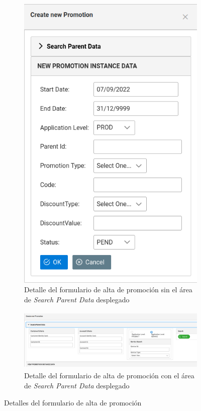 \begin{figure}[H]
  \centering
  \begin{subfigure}[c]{0.4\textwidth}
    \includegraphics[width=\textwidth]{imaxes/formulario-alta-promocion-01.png}
    \caption{Detalle del formulario de alta de promoción sin el área de \emph{Search Parent Data} desplegado}
    \label{fig:formulario-alta-promocion-01}
  \end{subfigure}
  \hspace{0.1\textwidth}
  \begin{subfigure}[c]{0.4\textwidth}
    \includegraphics[width=\textwidth,height=3cm]{imaxes/formulario-alta-promocion-02.png}
    \caption{Detalle del formulario de alta de promoción con el área de \emph{Search Parent Data} desplegado}
    \label{fig:formulario-alta-promocion-02}
  \end{subfigure}
  \caption{Detalles del formulario de alta de promoción}
  \label{fig:parametrizacion}
\end{figure}


